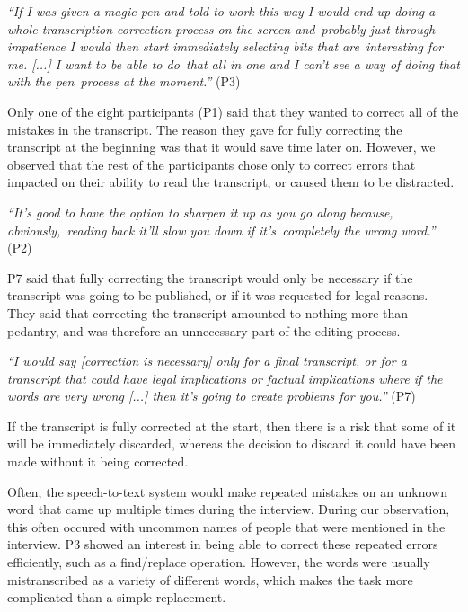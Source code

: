 \textit{``If I was given a magic pen and told to work this way I would end up doing a whole transcription correction
process on the screen and probably just through impatience I would then start immediately selecting bits that
are interesting for me. [...] I want to be able to do that all in one and I can't see a way of doing that with the
pen process at the moment.''} (P3)

Only one of the eight participants (P1) said that they wanted to correct all of the mistakes in the transcript. The
reason they gave for fully correcting the transcript at the beginning was that it would save time later on. However,
we observed that the rest of the participants chose only to correct errors that impacted on their ability to read the
transcript, or caused them to be distracted.

\textit{``It's good to have the option to sharpen it up as you go along because, obviously, reading back it'll slow
you down if it's completely the wrong word.''} (P2)

P7 said that fully correcting the transcript would only be necessary if the transcript was going to be
published, or if it was requested for legal reasons. They said that correcting the transcript amounted to nothing more
than pedantry, and was therefore an unnecessary part of the editing process.

\textit{``I would say [correction is necessary] only for a final transcript, or for a transcript that could have legal
  implications or factual implications where if the words are very wrong [...]
then it's going to create problems for you.''} (P7)

If the transcript is fully corrected at the start, then there is a risk that some of it will be immediately discarded,
whereas the decision to discard it could have been made without it being corrected.



Often, the speech-to-text system would make repeated mistakes on an unknown word that came up multiple times during the
interview. During our observation, this often occured with uncommon names of people that were mentioned in the
interview. P3 showed an interest in being able to correct these repeated errors efficiently, such as a find/replace
operation. However, the words were usually mistranscribed as a variety of different words, which makes the task more
complicated than a simple replacement.

